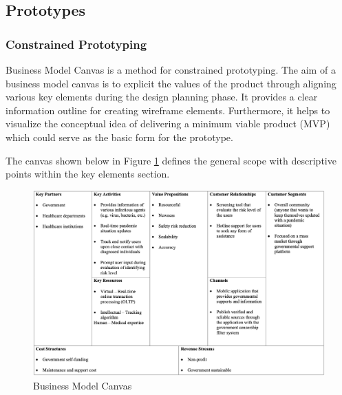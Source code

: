   \subsection{Prototypes}
    \subsubsection{Constrained Prototyping}
      \par Business Model Canvas is a method for constrained prototyping. The aim of a business model canvas is to explicit the values of the product through aligning various key elements during the design planning phase. It provides a clear information outline for creating wireframe elements. Furthermore, it helps to visualize the conceptual idea of delivering a minimum viable product (MVP) which could serve as the basic form for the prototype.

      \par The canvas shown below in Figure \ref{fig:bmc} defines the general scope with descriptive points within the key elements section.

      \begin{figure}[H]
        \centering
        \includegraphics[width=\linewidth]{img/bmc.png}
        \caption{Business Model Canvas}
        \label{fig:bmc}
      \end{figure}
    
